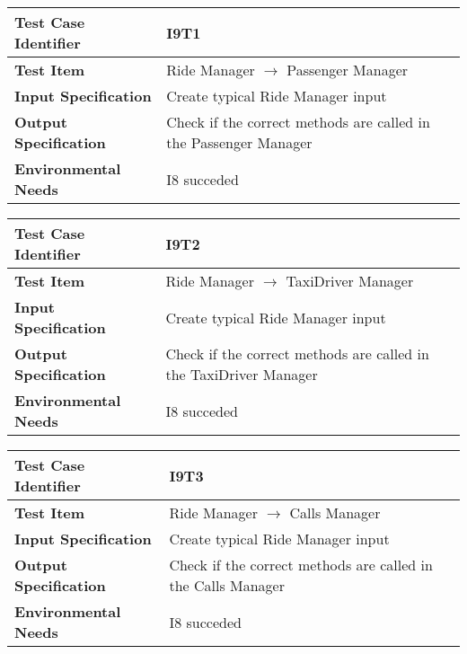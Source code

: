 \begin{table}[!htbp]
\begin{center}
\begin{tabular}[t]{p{}p{}}

\hline
\textbf{Test Case Identifier} & I9T1 \\
\hline
\textbf{Test Item} & Ride Manager $\rightarrow$ Passenger Manager \\
\hline
\textbf{Input Specification} & Create typical Ride Manager input \\
\hline
\textbf{Output Specification} & Check if the correct methods are called in the Passenger Manager \\
\hline
\textbf{Environmental Needs} & I8 succeded \\
\hline

\end{tabular}
\end{center}
\end{table}

\begin{table}[!htbp]
\begin{center}
\begin{tabular}[t]{p{}p{}}

\hline
\textbf{Test Case Identifier} & I9T2 \\
\hline
\textbf{Test Item} & Ride Manager $\rightarrow$ TaxiDriver Manager \\
\hline
\textbf{Input Specification} & Create typical Ride Manager input \\
\hline
\textbf{Output Specification} & Check if the correct methods are called in the TaxiDriver Manager \\
\hline
\textbf{Environmental Needs} & I8 succeded \\
\hline

\end{tabular}
\end{center}
\end{table}

\begin{table}[!htbp]
\begin{center}
\begin{tabular}[t]{p{}p{}}

\hline
\textbf{Test Case Identifier} & I9T3 \\
\hline
\textbf{Test Item} & Ride Manager $\rightarrow$ Calls Manager \\
\hline
\textbf{Input Specification} & Create typical Ride Manager input \\
\hline
\textbf{Output Specification} & Check if the correct methods are called in the Calls Manager \\
\hline
\textbf{Environmental Needs} & I8 succeded \\
\hline

\end{tabular}
\end{center}
\end{table}
\clearpage


